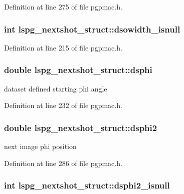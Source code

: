 Definition at line 275 of file pgpmac.\-h.

\hypertarget{structlspg__nextshot__struct_a5dd3db64790e09bc03499e521bbaa126}{
\subsubsection[{dsowidth\-\_\-isnull}]{\setlength{\rightskip}{0pt plus 5cm}int lspg\-\_\-nextshot\-\_\-struct\-::dsowidth\-\_\-isnull}}\label{structlspg__nextshot__struct_a5dd3db64790e09bc03499e521bbaa126}


Definition at line 215 of file pgpmac.\-h.

\hypertarget{structlspg__nextshot__struct_a64ebde597ca97a3b98145dc2d580c64f}{
\subsubsection[{dsphi}]{\setlength{\rightskip}{0pt plus 5cm}double lspg\-\_\-nextshot\-\_\-struct\-::dsphi}}\label{structlspg__nextshot__struct_a64ebde597ca97a3b98145dc2d580c64f}


dataset defined starting phi angle 



Definition at line 232 of file pgpmac.\-h.

\hypertarget{structlspg__nextshot__struct_a98857616b6bbb6ba861e96b6b7551756}{
\subsubsection[{dsphi2}]{\setlength{\rightskip}{0pt plus 5cm}double lspg\-\_\-nextshot\-\_\-struct\-::dsphi2}}\label{structlspg__nextshot__struct_a98857616b6bbb6ba861e96b6b7551756}


next image phi position 



Definition at line 286 of file pgpmac.\-h.

\hypertarget{structlspg__nextshot__struct_a57a9c43be86188f65b96d59c2adec674}{
\subsubsection[{dsphi2\-\_\-isnull}]{\setlength{\rightskip}{0pt plus 5cm}int lspg\-\_\-nextshot\-\_\-struct\-::dsphi2\-\_\-isnull}}\label{structlspg__nextshot__struct_a57a9c43be86188f65b96d59c2adec674}


